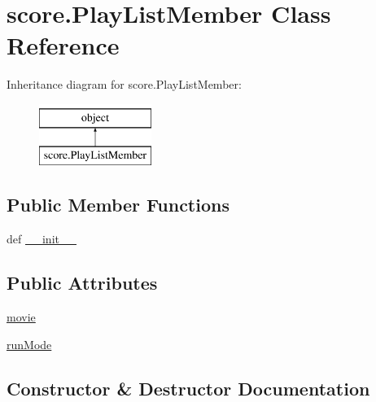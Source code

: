 \hypertarget{classscore_1_1PlayListMember}{}\section{score.\+Play\+List\+Member Class Reference}
\label{classscore_1_1PlayListMember}
Inheritance diagram for score.\+Play\+List\+Member\+:\begin{figure}[H]
\begin{center}
\leavevmode
\includegraphics[height=2.000000cm]{classscore_1_1PlayListMember}
\end{center}
\end{figure}
\subsection*{Public Member Functions}
\begin{DoxyCompactItemize}
\item 
def \hyperlink{classscore_1_1PlayListMember_a4ef546fa264077b352a023825ee5e398}{\+\_\+\+\_\+init\+\_\+\+\_\+}
\end{DoxyCompactItemize}
\subsection*{Public Attributes}
\begin{DoxyCompactItemize}
\item 
\hyperlink{classscore_1_1PlayListMember_a4c23e996053d838a19f3bdf2f9a3f0c5}{movie}
\item 
\hyperlink{classscore_1_1PlayListMember_a887c20f4c97eb19c71b74899a1d88661}{run\+Mode}
\end{DoxyCompactItemize}


\subsection{Constructor \& Destructor Documentation}
\hypertarget{classscore_1_1PlayListMember_a4ef546fa264077b352a023825ee5e398}{}
